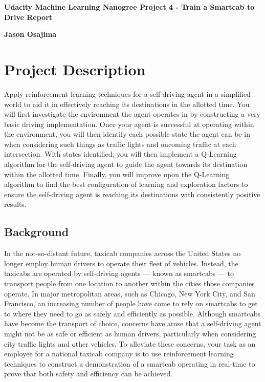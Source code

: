 \documentclass[11pt]{article}
\begin{document}
\begin{center}
    \Large
    \textbf{Udacity Machine Learning Nanogree Project 4 - Train a Smartcab to Drive Report}
    
    \vspace{0.4cm}
    \large
    \textbf{Jason Osajima}
\end{center}



\section{Project Description}
\label{Summary}

Apply reinforcement learning techniques for a self-driving agent in a simplified world to aid it in effectively reaching its destinations in the allotted time. You will first investigate the environment the agent operates in by constructing a very basic driving implementation. Once your agent is successful at operating within the environment, you will then identify each possible state the agent can be in when considering such things as traffic lights and oncoming traffic at each intersection. With states identified, you will then implement a Q-Learning algorithm for the self-driving agent to guide the agent towards its destination within the allotted time. Finally, you will improve upon the Q-Learning algorithm to find the best configuration of learning and exploration factors to ensure the self-driving agent is reaching its destinations with consistently positive results.

\subsection{Background}

In the not-so-distant future, taxicab companies across the United States no longer employ human drivers to operate their fleet of vehicles. Instead, the taxicabs are operated by self-driving agents — known as smartcabs — to transport people from one location to another within the cities those companies operate. In major metropolitan areas, such as Chicago, New York City, and San Francisco, an increasing number of people have come to rely on smartcabs to get to where they need to go as safely and efficiently as possible. Although smartcabs have become the transport of choice, concerns have arose that a self-driving agent might not be as safe or efficient as human drivers, particularly when considering city traffic lights and other vehicles. To alleviate these concerns, your task as an employee for a national taxicab company is to use reinforcement learning techniques to construct a demonstration of a smartcab operating in real-time to prove that both safety and efficiency can be achieved.
\end{document}
